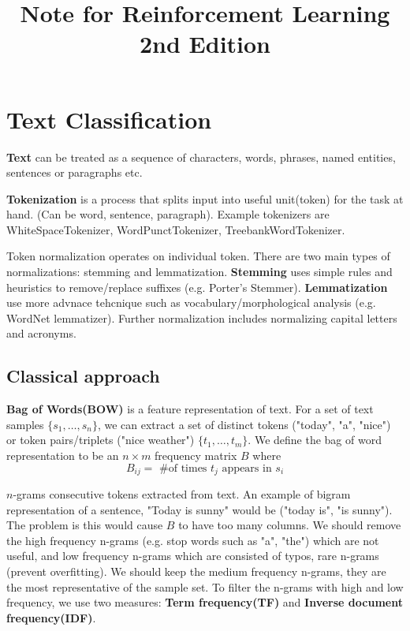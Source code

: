 \documentclass[twocolumn, 10pt]{article}
\title{Note for Reinforcement Learning 2nd Edition}
\begin{document}
\maketitle

\section{Text Classification}
\textbf{Text} can be treated as a sequence of characters, words, phrases, named entities,  sentences or paragraphs etc.

\textbf{Tokenization} is a process that splits input into useful unit(token) for the task at hand. (Can be word, sentence, paragraph). Example tokenizers are WhiteSpaceTokenizer,  WordPunctTokenizer, TreebankWordTokenizer. 

Token normalization operates on individual token. There are two main types of normalizations:  stemming and lemmatization. \textbf{Stemming} uses simple rules and heuristics to remove/replace suffixes (e.g. Porter's Stemmer). \textbf{Lemmatization} use more advnace tehcnique such as vocabulary/morphological analysis (e.g. WordNet lemmatizer). Further normalization includes normalizing capital letters and acronyms.

\subsection*{Classical approach}
\textbf{Bag of Words(BOW)} is a feature representation of text. For a set of text samples $\{s_1, \ldots, s_n\}$, we can extract  a set of distinct tokens ("today", "a", "nice") or token pairs/triplets ("nice weather") $\{t_1, \ldots, t_m \}$. We define the bag of word representation  to be an $n \times m$ frequency matrix $B$ where $$B_{ij} = \mbox{ \# of times  } t_j \mbox{  appears in  } s_i$$ 

$n$-grams consecutive tokens extracted from text. An example of bigram representation of a sentence, "Today is sunny" would be ("today is", "is sunny"). The problem is this would cause $B$ to have too many columns. We should remove the high frequency n-grams (e.g. stop words such as "a", "the") which are not useful, and low frequency n-grams which are consisted of typos, rare n-grams (prevent overfitting).  We should keep the medium frequency n-grams, they are the most representative of the sample set. To filter the n-grams with high and low frequency, we use two measures: \textbf{Term frequency(TF)} and \textbf{Inverse document frequency(IDF)}.
\end{document}
